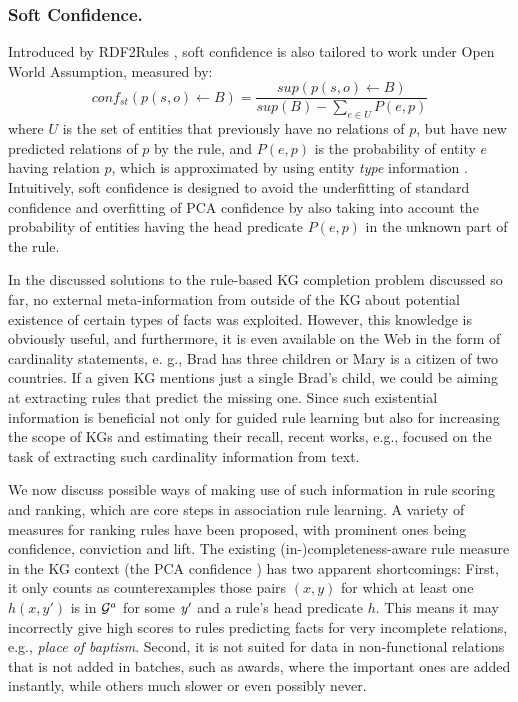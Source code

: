 \subsubsection{Soft Confidence.} Introduced by RDF2Rules \cite{rdf2rules}, soft confidence is also tailored to work under Open World Assumption, measured by:
\[conf_{st}(p(s,o) \leftarrow B) = \frac{sup(p(s,o) \leftarrow B)}{sup(B) - \sum_{e \in U}P(e,p)} \]
where $U$ is the set of entities that previously have no relations of $p$, but have new predicted relations of $p$ by the rule, and $P(e,p)$ is the probability of entity $e$ having relation $p$, which is approximated by using entity \textit{type} information \cite{rdf2rules}. Intuitively, soft confidence is designed to avoid the underfitting of standard confidence and overfitting of PCA confidence by also taking into account the probability of entities having the head predicate $P(e,p)$ in the unknown part of the rule.

In the discussed solutions to the rule-based KG completion problem discussed so far, no external meta-information
from outside of the KG about potential existence of certain types of facts was exploited.
However, this knowledge is obviously useful, and furthermore, it is even available on the Web
in the form of cardinality statements, e. g., Brad has three children or Mary is a citizen of two countries. 
If a given KG mentions just a single Brad’s child, we could be aiming at extracting rules that predict the missing
one. Since such existential information is beneficial not only for guided rule learning but
also for increasing the scope of KGs and estimating their recall, recent works, e.g., \cite{cardinality-extraction-iswc-2016} focused 
on the task of extracting such cardinality information from text.

We now discuss possible ways of making use of such information in rule scoring and ranking, which are core steps in association rule learning. A variety of measures for ranking rules have been proposed, with prominent ones being confidence, conviction and lift.  
The existing (in-)completeness-aware rule measure in the KG context (the PCA confidence \cite{amie}) 
has two apparent shortcomings: First,  
it only counts as counterexamples those %
pairs $(x,y)$ for which at least one 
$h(x,y')$ %
is in $\mathcal{G}^a$ for some $\mathit{y'}$ and a rule's head predicate $h$. This means it may incorrectly give high scores to rules predicting facts for very incomplete relations, e.g., \emph{place of baptism}. 
Second, it is not suited for data in non-functional relations that is not added in batches, such as awards, where 
the important ones are added instantly, 
while others much slower or even possibly never. 


